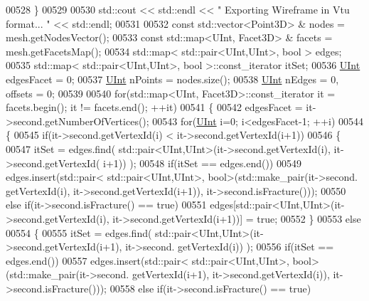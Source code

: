 \begin{DoxyCode}
00528     \}
00529 
00530     std::cout << std::endl << \textcolor{stringliteral}{" Exporting Wireframe in Vtu format... "} << std::endl;
00531 
00532     \textcolor{keyword}{const} std::vector<Point3D> & nodes = mesh.getNodesVector();
00533     \textcolor{keyword}{const} std::map<UInt, Facet3D> & facets = mesh.getFacetsMap();
00534     std::map< std::pair<UInt,UInt>, \textcolor{keywordtype}{bool} > edges;
00535     std::map< std::pair<UInt,UInt>, \textcolor{keywordtype}{bool} >::const\_iterator itSet;
00536     \hyperlink{namespaceFVCode3D_a4bf7e328c75d0fd504050d040ebe9eda}{UInt} edgesFacet = 0;
00537     \hyperlink{namespaceFVCode3D_a4bf7e328c75d0fd504050d040ebe9eda}{UInt} nPoints = nodes.size();
00538     \hyperlink{namespaceFVCode3D_a4bf7e328c75d0fd504050d040ebe9eda}{UInt} nEdges = 0, offsets = 0;
00539 
00540     \textcolor{keywordflow}{for}(std::map<UInt, Facet3D>::const\_iterator it = facets.begin(); it != facets.end(); ++it)
00541     \{
00542         edgesFacet = it->second.getNumberOfVertices();
00543         \textcolor{keywordflow}{for}(\hyperlink{namespaceFVCode3D_a4bf7e328c75d0fd504050d040ebe9eda}{UInt} i=0; i<edgesFacet-1; ++i)
00544         \{
00545             \textcolor{keywordflow}{if}(it->second.getVertexId(i) < it->second.getVertexId(i+1))
00546             \{
00547                 itSet = edges.find( std::pair<UInt,UInt>(it->second.getVertexId(i), it->second.getVertexId(
      i+1)) );
00548                 \textcolor{keywordflow}{if}(itSet == edges.end())
00549                     edges.insert(std::pair< std::pair<UInt,UInt>, \textcolor{keywordtype}{bool}>(std::make\_pair(it->second.
      getVertexId(i), it->second.getVertexId(i+1)), it->second.isFracture()));
00550                 \textcolor{keywordflow}{else} \textcolor{keywordflow}{if}(it->second.isFracture() == \textcolor{keyword}{true})
00551                     edges[std::pair<UInt,UInt>(it->second.getVertexId(i), it->second.getVertexId(i+1))] = \textcolor{keyword}{
      true};
00552             \}
00553             \textcolor{keywordflow}{else}
00554             \{
00555                 itSet = edges.find( std::pair<UInt,UInt>(it->second.getVertexId(i+1), it->second.
      getVertexId(i)) );
00556                 \textcolor{keywordflow}{if}(itSet == edges.end())
00557                     edges.insert(std::pair< std::pair<UInt,UInt>, \textcolor{keywordtype}{bool}>(std::make\_pair(it->second.
      getVertexId(i+1), it->second.getVertexId(i)), it->second.isFracture()));
00558                 \textcolor{keywordflow}{else} \textcolor{keywordflow}{if}(it->second.isFracture() == \textcolor{keyword}{true})

\end{DoxyCode}
